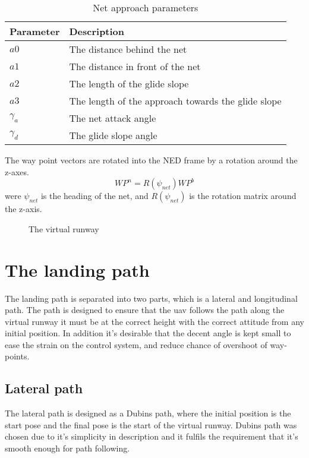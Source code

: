 \begin{table}[H]
\begin{center}
    \begin{tabular}{ | l | l |}
    \hline
    \textbf{Parameter} & \textbf{Description} \\ \hline
    $a0$ & The distance behind the net \\ \hline
    $a1$ & The distance in front of the net \\ \hline
    $a2$ & The length of the glide slope \\ \hline
    $a3$ & The length of the approach towards the glide slope \\ \hline
    $\gamma_a$ & The net attack angle \\ \hline
    $\gamma_d$ & The glide slope angle \\ \hline
    \end{tabular}
\end{center}
\caption{Net approach parameters }
\label{Tb:Approach Parameters}
\end{table}
The way point vectors are rotated into the NED frame by a rotation around the z-axes.
\begin{equation}
WP^n = R(\psi_{net})WP^b
\end{equation}
were $\psi_{net}$ is the heading of the net, and $R(\psi_{net})$ is the rotation matrix around the z-axis.
\begin{figure}\label{Fig:LandingPhase}
\def\svgwidth{\textwidth} %

\caption{The virtual runway}
\end{figure}

\section{The landing path}\label{SS:LandingApproach}
The landing path is separated into two parts, which is a lateral and longitudinal path. The path is designed to ensure that the \gls{uav} follows the path along the virtual runway it must be at the correct height with the correct attitude from any initial position. In addition it's desirable that the decent angle is kept small to ease the strain on the control system, and reduce chance of overshoot of way-points.
\subsection{Lateral path}
The lateral path is designed as a Dubins path, where the initial position is the start pose and the final pose is the start of the virtual runway. Dubins path was chosen due to it's simplicity in description and it fulfils the requirement that it's smooth enough for path following.
